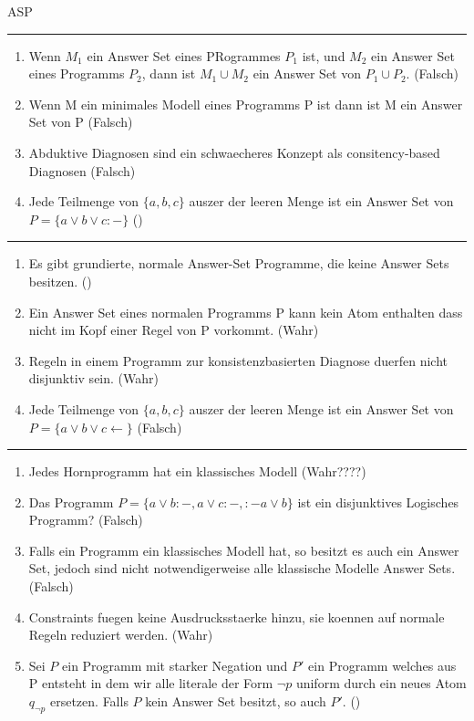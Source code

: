 \documentclass[a4paper,oneside,10pt,DIV12,headsepline,footexclude,headexclude]{scrartcl}
\begin{document}
\begin{section}{ASP}
    \rule{\textwidth}{1pt}        
    
    \begin{enumerate}
        \item Wenn $M_1$ ein Answer Set eines PRogrammes $P_1$ ist, und $M_2$ ein Answer Set eines Programms $P_2$, dann ist $M_1 \cup M_2$ ein Answer Set von $P_1 \cup P_2$. (Falsch)
        \item Wenn M ein minimales Modell eines Programms P ist dann ist M ein Answer Set von P (Falsch)
        \item Abduktive Diagnosen sind ein schwaecheres Konzept als consitency-based Diagnosen (Falsch)
        \item Jede Teilmenge von $\{a, b, c\}$ auszer der leeren Menge ist ein Answer Set von $P = \{a \vee b \vee c:-\}$ ()
    \end{enumerate}

    \rule{\textwidth}{1pt}

    \begin{enumerate}
        \item Es gibt grundierte, normale Answer-Set Programme, die keine Answer Sets besitzen. ()
        \item Ein Answer Set eines normalen Programms P kann kein Atom enthalten dass nicht im Kopf einer Regel von P vorkommt. (Wahr)
        \item Regeln in einem Programm zur konsistenzbasierten Diagnose duerfen nicht disjunktiv sein. (Wahr)
        \item Jede Teilmenge von $\{a, b, c\}$ auszer der leeren Menge ist ein Answer Set von $P = \{a \vee b \vee c \leftarrow \}$ (Falsch)
    \end{enumerate}

    \rule{\textwidth}{1pt}

    \begin{enumerate}
    \item Jedes Hornprogramm hat ein klassisches Modell  (Wahr????)
    \item Das Programm $P = \{a \vee b :-, a \vee c :-, :- a \vee b\}$ ist ein disjunktives Logisches Programm? (Falsch)
    \item Falls ein Programm ein klassisches Modell hat, so besitzt es auch ein Answer Set, jedoch sind nicht notwendigerweise alle klassische Modelle Answer Sets. (Falsch)
    \item Constraints fuegen keine Ausdrucksstaerke hinzu, sie koennen auf normale Regeln reduziert werden. (Wahr)
    \item Sei $P$ ein Programm mit starker Negation und $P'$ ein Programm welches aus P entsteht in dem wir alle literale der Form $\neg p$ uniform durch ein neues Atom $q_{\neg p}$ ersetzen.
    Falls $P$ kein Answer Set besitzt, so auch $P'$. ()
    \end{enumerate}


\end{section}
\end{document}
